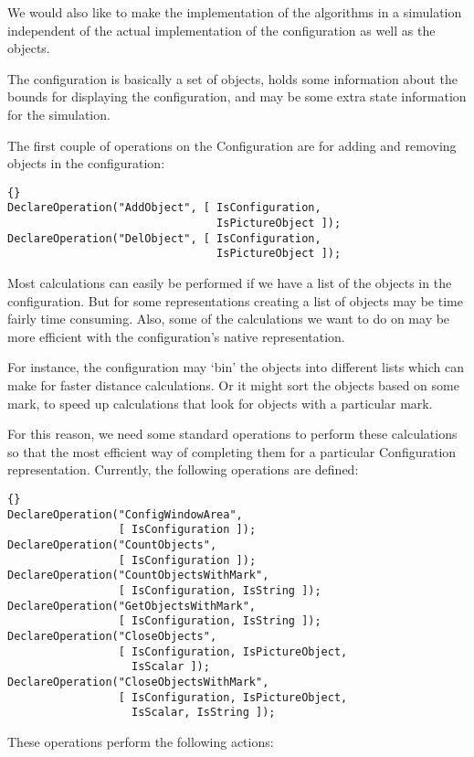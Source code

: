 \documentclass[12pt,a4paper]{book}  %
\begin{document}
We would also like to make the implementation of the algorithms in a
simulation independent of the actual implementation of the
configuration as well as the objects.

The configuration is basically a set of objects, holds some
information about the bounds for displaying the configuration, and may
be some extra state information for the simulation.

The first couple of operations on the Configuration are for adding and
removing objects in the configuration:

\begin{lstlisting}{}
DeclareOperation("AddObject", [ IsConfiguration,
                                IsPictureObject ]);
DeclareOperation("DelObject", [ IsConfiguration,
                                IsPictureObject ]);
\end{lstlisting}

Most calculations can easily be performed if we have a list of the
objects in the configuration.  But for some representations creating a
list of objects may be time fairly time consuming.  Also, some of the
calculations we want to do on may be more efficient with the
configuration's native representation.

For instance, the configuration may `bin' the objects into different
lists which can make for faster distance calculations.  Or it might
sort the objects based on some mark, to speed up calculations that
look for objects with a particular mark.

For this reason, we need some standard operations to perform these
calculations so that the most efficient way of completing them for a
particular Configuration representation.  Currently, the following
operations are defined:

\begin{lstlisting}{}
DeclareOperation("ConfigWindowArea",
                 [ IsConfiguration ]);
DeclareOperation("CountObjects",
                 [ IsConfiguration ]);
DeclareOperation("CountObjectsWithMark",
                 [ IsConfiguration, IsString ]);
DeclareOperation("GetObjectsWithMark",
                 [ IsConfiguration, IsString ]);
DeclareOperation("CloseObjects",
                 [ IsConfiguration, IsPictureObject,
                   IsScalar ]);
DeclareOperation("CloseObjectsWithMark",
                 [ IsConfiguration, IsPictureObject,
                   IsScalar, IsString ]);
\end{lstlisting}

These operations perform the following actions:
\end{document}
